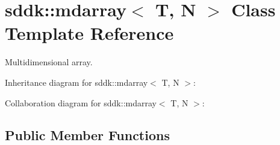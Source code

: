 \hypertarget{classsddk_1_1mdarray}{}\section{sddk\+:\+:mdarray$<$ T, N $>$ Class Template Reference}
\label{classsddk_1_1mdarray}


Multidimensional array.  




Inheritance diagram for sddk\+:\+:mdarray$<$ T, N $>$\+:


Collaboration diagram for sddk\+:\+:mdarray$<$ T, N $>$\+:
\subsection*{Public Member Functions}
